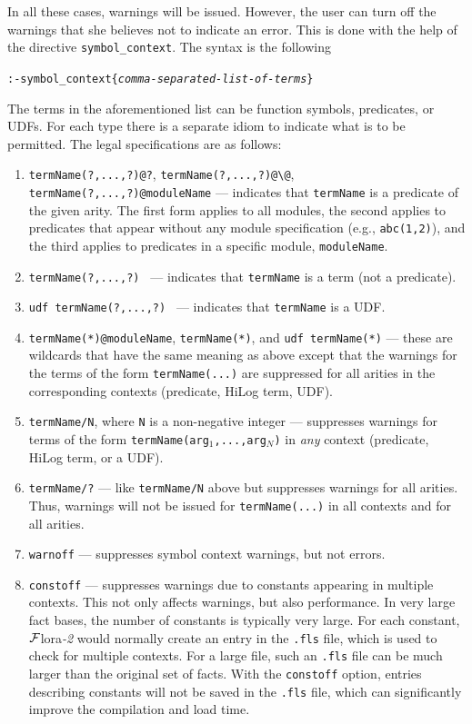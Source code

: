 \documentclass[11pt]{article}
\newcommand{\FLORA}{{\mbox{\sc ${\cal F}${lora}\rm\emph{-2}}}\xspace}
\newcommand{\FLSYSTEM}{\FLORA}
\newcommand{\bs}{\textbackslash}
\begin{document}
In all these cases, warnings will be issued. However, the user can turn off
the warnings that she believes not to indicate an error. This is done with
the help of the directive
\texttt{symbol\_context}.  The syntax is the following
\begin{alltt}
:- symbol_context\{\textnormal{\emph{comma-separated-list-of-terms}}\}
\end{alltt}

The terms in the aforementioned list can be function symbols, predicates,
or UDFs. For each type there is a separate idiom to indicate what is to be
permitted.
The legal specifications are as follows:
\begin{enumerate}
\item \texttt{termName(?,...,?)@?}, \texttt{termName(?,...,?)@\bs{}@},
  \texttt{termName(?,...,?)@moduleName} --- indicates that
  \texttt{termName} is a predicate of the given arity. The first form
  applies to all modules,
  the second applies to predicates that appear without any module specification
  (e.g., \texttt{abc(1,2)}), and the third applies to predicates in a
  specific module, \texttt{moduleName}.  
\item {\tt termName(?,...,?) } --- indicates that \texttt{termName} is a
  term (not a predicate).
\item {\tt udf termName(?,...,?) } --- indicates that \texttt{termName}
  is a UDF.
\item \texttt{termName(*)@moduleName}, \texttt{termName(*)}, and \texttt{udf
    termName(*)} --- these are wildcards that have the same meaning as
  above except that the warnings for the terms of the form
  \texttt{termName(...)}  are suppressed for all arities in the
  corresponding contexts (predicate, HiLog term, UDF).
\item \texttt{termName/N}, where \texttt{N} is a non-negative integer ---
  suppresses warnings for terms of the form
  \texttt{termName(arg$_1$,...,arg$_N$)} in \emph{any} context (predicate,
  HiLog term, or a UDF).
\item \texttt{termName/?} --- like \texttt{termName/N} above but suppresses
  warnings for all arities. Thus, warnings will not be issued for
  \texttt{termName(...)} in all contexts and for all arities.
\item \texttt{warnoff} --- suppresses symbol context warnings, but not errors.
\item \texttt{constoff} --- suppresses warnings due to constants appearing
  in multiple contexts. This not only affects warnings, but also performance.
  In very large fact bases, the number of constants is typically very large.
  For each constant, \FLSYSTEM would normally create an entry in the
  \texttt{.fls} file, which is used to check for multiple contexts.
  For a large file, such an \texttt{.fls} file can be much larger than the
  original set of facts. 
  With the \texttt{constoff} option, entries describing constants  will not be
  saved in the \texttt{.fls} file, which can significantly improve the
  compilation and load time. 
\end{enumerate}
\end{document}
